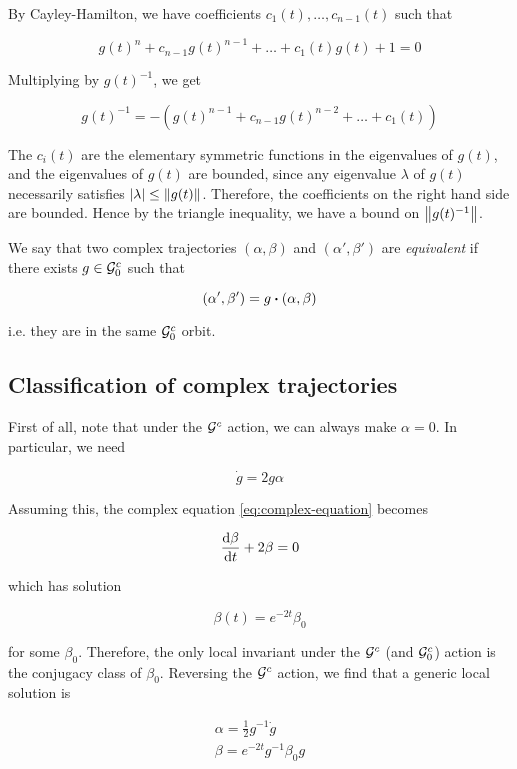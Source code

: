 \documentclass{report}
\begin{document}
By Cayley-Hamilton, we have coefficients \(c_1(t), \dots, c_{n-1}(t)\) such that

\[g(t)^n + c_{n-1}g(t)^{n-1} + \dots + c_1(t)g(t) + 1 = 0\]

Multiplying by \(g(t)^{-1}\), we get

\[g(t)^{-1} = -\left(g(t)^{n-1} + c_{n-1}g(t)^{n-2} + \dots + c_1(t)\right)\]

The \(c_i(t)\) are the elementary symmetric functions in the eigenvalues of \(g(t)\), and the eigenvalues of \(g(t)\) are bounded, since any eigenvalue \(\lambda\) of \(g(t)\) necessarily satisfies \(\abs{\lambda} \le \norm{g(t)}\). Therefore, the coefficients on the right hand side are bounded. Hence by the triangle inequality, we have a bound on \(\norm{g(t)^{-1}}\).

\begin{definition}
    [equivalent] We say that two complex trajectories \((\alpha, \beta)\) and \((\alpha', \beta')\) are \emph{equivalent} if there exists \(g \in \mathcal{G}^c_0\) such that

    \[(\alpha', \beta') = g \vdot (\alpha, \beta)\]

    i.e. they are in the same \(\mathcal{G}_0^c\) orbit.
\end{definition}

\subsection{Classification of complex trajectories}

First of all, note that under the \(\mathcal{G}^c\) action, we can always make \(\alpha = 0\). In particular, we need

\[\dot g = 2g\alpha\]

Assuming this, the complex equation \cref{eq:complex-equation} becomes

\[\dv{\beta}{t} + 2\beta = 0\]

which has solution

\[\beta(t) = e^{-2t}\beta_0\]

for some \(\beta_0\). Therefore, the only local invariant under the \(\mathcal{G}^c\) (and \(\mathcal{G}^c_0\)) action is the conjugacy class of \(\beta_0\). Reversing the \(\mathcal{G}^c\) action, we find that a generic local solution is

\begin{align*}
    \alpha = \frac{1}{2}g^{-1}\dot g \\
    \beta = e^{-2t}g^{-1}\beta_0g
\end{align*}
\end{document}
